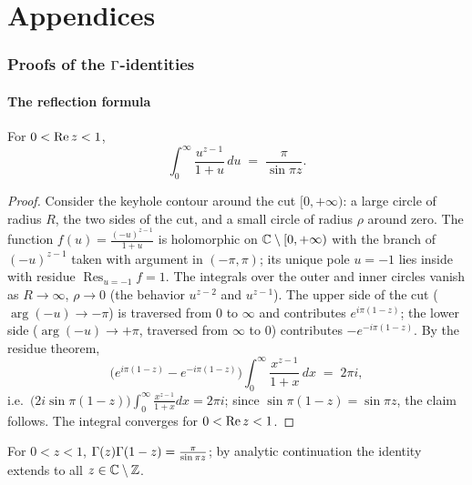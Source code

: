 \appendix

\part*{Appendices}

\section{Proofs of the $\Gamma$-identities}\label{app:gamma}

\subsection{The reflection formula}

\begin{proposition}\label{prop:euler}
For $0<\operatorname{Re} z<1$,
\[
  \int_0^\infty \frac{u^{z-1}}{1+u}\,du \;=\; \frac{\pi}{\sin \pi z}.
\]
\end{proposition}

\begin{proof}
Consider the keyhole contour around the cut $[0,+\infty)$: a large
circle of radius $R$, the two sides of the cut, and a small circle
of radius $\rho$ around zero. The function
$f(u)=\frac{(-u)^{z-1}}{1+u}$ is holomorphic on
$\mathbb{C}\setminus[0,+\infty)$ with the branch of $(-u)^{z-1}$ taken with
argument in $(-\pi,\pi)$; its unique pole $u=-1$ lies inside with
residue $\operatorname{Res}_{u=-1}f=1$. The integrals over the outer
and inner circles vanish as $R\to\infty$, $\rho\to0$ (the behavior
$u^{z-2}$ and $u^{z-1}$). The upper side of the cut
($\arg(-u)\to-\pi$) is traversed from $0$ to $\infty$ and contributes
$e^{i\pi(1-z)}$; the lower side ($\arg(-u)\to+\pi$, traversed from
$\infty$ to $0$) contributes $-e^{-i\pi(1-z)}$. By the residue
theorem,
\[
  \bigl(e^{i\pi(1-z)}-e^{-i\pi(1-z)}\bigr)
  \int_0^\infty\frac{x^{z-1}}{1+x}\,dx \;=\;2\pi i,
\]
i.e.\ $\bigl(2i\sin\pi(1-z)\bigr)\int_0^\infty\frac{x^{z-1}}{1+x}
dx=2\pi i$; since $\sin\pi(1-z)=\sin\pi z$, the claim follows. The
integral converges for $0<\operatorname{Re} z<1$.
\end{proof}

\begin{proposition}\label{prop:reflection}
For $0<z<1$, $\Gamma(z)\Gamma(1-z)=\frac{\pi}{\sin\pi z}$; by analytic
continuation the identity extends to all $z\in\mathbb{C}\setminus\mathbb{Z}$.
\end{proposition}

